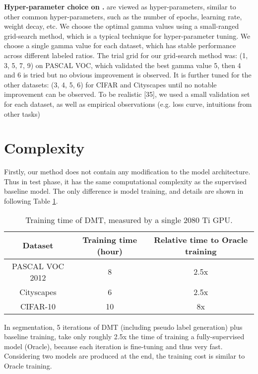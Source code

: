 \documentclass[preprint,review,10pt]{elsarticle}
\begin{document}
\textbf{Hyper-parameter choice on .}  are viewed as hyper-parameters, similar to other common hyper-parameters, such as the number of epochs, learning rate, weight decay, etc.  We choose the optimal gamma values using a small-ranged grid-search method, which is a typical technique for hyper-parameter tuning. We choose a single gamma value for each dataset, which has stable performance across different labeled ratios. The trial grid for our grid-search method was: (1, 3, 5, 7, 9) on PASCAL VOC, which validated the best gamma value 5, then 4 and 6 is tried but no obvious improvement is observed. It is further tuned for the other datasets: (3, 4, 5, 6) for CIFAR and Cityscapes until no notable improvement can be observed. To be realistic [35], we used a small validation set for each dataset, as well as empirical observations (e.g. loss curve, intuitions from other tasks) 



\section{Complexity}
\label{a:r4}

Firstly, our method does not contain any modification to the model architecture. Thus in test phase, it has the same computational complexity as the supervised baseline model. The only difference is model training, and  details are shown in following Table \ref{table:1}.

\begin{table}[h]
\caption{Training time of DMT, measured by a single 2080 Ti GPU.}
\label{table:1}
\centering
\begin{tabular}{ccc} \toprule
Dataset & Training time (hour) & Relative time to Oracle training \\
\midrule

PASCAL VOC 2012 & 8 & 2.5x \\
Cityscapes & 6 & 2.5x \\
CIFAR-10 & 10 & 8x \\

\bottomrule
\end{tabular}
\end{table}

In segmentation, 5 iterations of DMT (including pseudo label generation) plus baseline training, take only roughly 2.5x the time of training a fully-supervised model (Oracle), because each iteration is fine-tuning and thus very fast. Considering two models are produced at the end, the training cost is similar to Oracle training.
\end{document}
